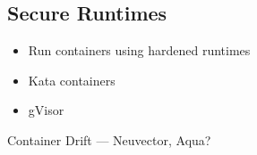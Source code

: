 \documentclass{dcpresentation}
\begin{document}
\subsection{Secure Runtimes}

\begin{frame}
 \begin{itemize}
  \item Run containers using hardened runtimes
  \item Kata containers
  \item gVisor
 \end{itemize}
\end{frame}
 
 
 \begin{frame}
 Container Drift --- Neuvector, Aqua?
 \end{frame}
\end{document}
